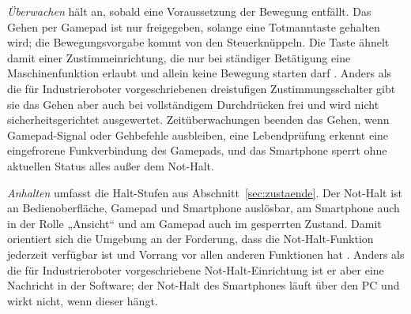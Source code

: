 \emph{Überwachen} hält an, sobald eine Voraussetzung der Bewegung entfällt.
Das Gehen per Gamepad ist nur freigegeben, solange eine Totmanntaste gehalten wird; die Bewegungsvorgabe kommt von den Steuerknüppeln.
Die Taste ähnelt damit einer Zustimmeinrichtung, die nur bei ständiger Betätigung eine Maschinenfunktion erlaubt und allein keine Bewegung starten darf \cite{DGUV2015}.
Anders als die für Industrieroboter vorgeschriebenen dreistufigen Zustimmungsschalter \cite{DGUV2015} gibt sie das Gehen aber auch bei vollständigem Durchdrücken frei und wird nicht sicherheitsgerichtet ausgewertet.
Zeitüberwachungen beenden das Gehen, wenn Gamepad-Signal oder Gehbefehle ausbleiben, eine Lebendprüfung erkennt eine eingefrorene Funkverbindung des Gamepads, und das Smartphone sperrt ohne aktuellen Status alles außer dem Not-Halt.

\emph{Anhalten} umfasst die Halt-Stufen aus Abschnitt~\ref{sec:zustaende}.
Der Not-Halt ist an Bedienoberfläche, Gamepad und Smartphone auslösbar, am Smartphone auch in der Rolle „Ansicht“ und am Gamepad auch im gesperrten Zustand.
Damit orientiert sich die Umgebung an der Forderung, dass die Not-Halt-Funktion jederzeit verfügbar ist und Vorrang vor allen anderen Funktionen hat \cite{DINENISO13850}.
Anders als die für Industrieroboter vorgeschriebene Not-Halt-Einrichtung \cite{DGUV2015} ist er aber eine Nachricht in der Software; der Not-Halt des Smartphones läuft über den PC und wirkt nicht, wenn dieser hängt.

